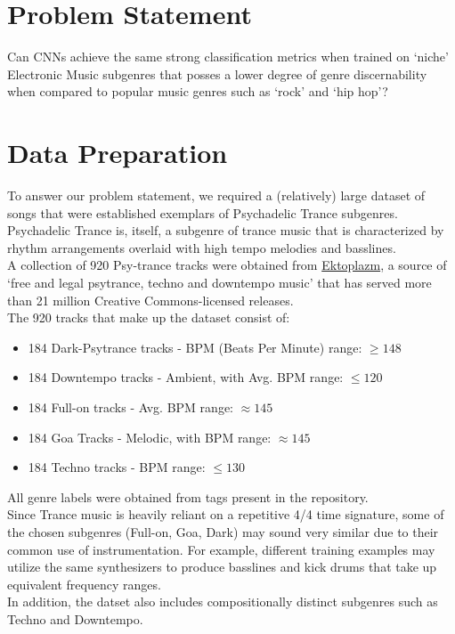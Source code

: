 \documentclass[12pt]{article}
\newcounter{ct}
\begin{document}
\section*{Problem Statement}
Can CNNs achieve the same strong classification metrics when trained
on `niche' Electronic Music subgenres that posses a lower degree 
of genre discernability when compared to popular music genres
such as `rock' and `hip hop'?

\section*{Data Preparation}
To answer our problem statement, we required a (relatively) large dataset of 
songs that were established exemplars of 
Psychadelic Trance subgenres.\\
Psychadelic Trance is, itself, a subgenre of trance music that is characterized
by rhythm arrangements overlaid with high tempo melodies 
and basslines. \\
A collection of 920 Psy-trance tracks were obtained from 
\href{http://www.ektoplazm.com/}{Ektoplazm}, a  
source of `free and legal psytrance, techno and downtempo music' that
has served more than 21 million Creative Commons-licensed releases.\\
The 920 tracks that make up the dataset consist of:
\begin{itemize}
    \item 184 Dark-Psytrance tracks - 
    BPM (Beats Per Minute) range: $\ge 148$
    \item 184 Downtempo tracks  - Ambient, with Avg. BPM range: $\le 120$
    \item 184 Full-on tracks -  Avg. BPM range: $\approx 145$
    \item 184 Goa Tracks - Melodic, with BPM range: $\approx 145$
    \item 184 Techno tracks - BPM range: $\le 130$
\end{itemize}
All genre labels were obtained from tags present in the repository.\\
Since Trance music is heavily reliant on a repetitive 4/4 time signature, 
some of the chosen subgenres (Full-on, Goa, Dark) may sound very similar 
due to their common use of instrumentation. For example, 
different training examples may utilize the same synthesizers
to produce basslines and kick drums 
that take up equivalent frequency ranges.\\
In addition, the datset also includes compositionally distinct subgenres such 
as Techno and Downtempo.
\end{document}
